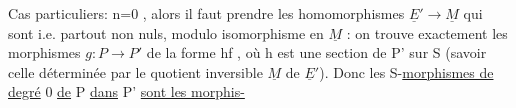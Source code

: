 Cas particuliers:  n=0 , alors  il faut prendre  les  homomorphismes
$\underline{E}' \to \underline{M}$  qui sont  i.e. partout non nuls, modulo isomorphisme en $\underline{M}$ : on trouve
exactement les  morphismes  $g\colon P \to P'$  de la forme  hf , où  h est une
section de  P' sur S  (savoir celle déterminée par  le quotient inversible
$\underline{M}$ de $\underline{E}'$). Donc les S-\uline{morphismes de  degré} 0  \uline{de} P \uline{dans} P' \uline{sont les morphis-}%

